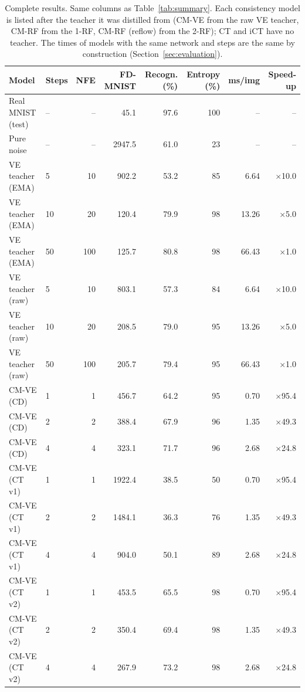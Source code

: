 \documentclass{article}
\begin{document}
\begin{table}[H]
  \caption{Complete results. Same columns as Table~\ref{tab:summary}. Each
  consistency model is listed after the teacher it was distilled from (CM-VE
  from the raw VE teacher, CM-RF from the 1-RF, CM-RF (reflow) from the 2-RF);
  CT and iCT have no teacher. The times of models with the same network and
  steps are the same by construction (Section~\ref{sec:evaluation}).}
  \label{tab:full}
  \centering
  \footnotesize
  \setlength{\tabcolsep}{4pt}
  \begin{tabular}{llrrrrrr}
    \toprule
    Model & Steps & NFE & FD-MNIST & Recogn. (\%) & Entropy (\%) & ms/img & Speed-up \\
    \midrule
    Real MNIST (test) & -- & -- & 45.1 & 97.6 & 100 & -- & -- \\
    Pure noise & -- & -- & 2947.5 & 61.0 & 23 & -- & -- \\
    \midrule
    VE teacher (EMA) & 5 & 10 & 902.2 & 53.2 & 85 & 6.64 & $\times$10.0 \\
    VE teacher (EMA) & 10 & 20 & 120.4 & 79.9 & 98 & 13.26 & $\times$5.0 \\
    VE teacher (EMA) & 50 & 100 & 125.7 & 80.8 & 98 & 66.43 & $\times$1.0 \\
    VE teacher (raw) & 5 & 10 & 803.1 & 57.3 & 84 & 6.64 & $\times$10.0 \\
    VE teacher (raw) & 10 & 20 & 208.5 & 79.0 & 95 & 13.26 & $\times$5.0 \\
    VE teacher (raw) & 50 & 100 & 205.7 & 79.4 & 95 & 66.43 & $\times$1.0 \\
    \midrule
    CM-VE (CD) & 1 & 1 & 456.7 & 64.2 & 95 & 0.70 & $\times$95.4 \\
    CM-VE (CD) & 2 & 2 & 388.4 & 67.9 & 96 & 1.35 & $\times$49.3 \\
    CM-VE (CD) & 4 & 4 & 323.1 & 71.7 & 96 & 2.68 & $\times$24.8 \\
    \midrule
    CM-VE (CT v1) & 1 & 1 & 1922.4 & 38.5 & 50 & 0.70 & $\times$95.4 \\
    CM-VE (CT v1) & 2 & 2 & 1484.1 & 36.3 & 76 & 1.35 & $\times$49.3 \\
    CM-VE (CT v1) & 4 & 4 & 904.0 & 50.1 & 89 & 2.68 & $\times$24.8 \\
    \midrule
    CM-VE (CT v2) & 1 & 1 & 453.5 & 65.5 & 98 & 0.70 & $\times$95.4 \\
    CM-VE (CT v2) & 2 & 2 & 350.4 & 69.4 & 98 & 1.35 & $\times$49.3 \\
    CM-VE (CT v2) & 4 & 4 & 267.9 & 73.2 & 98 & 2.68 & $\times$24.8 \\

\end{tabular}
\end{table}
\end{document}
